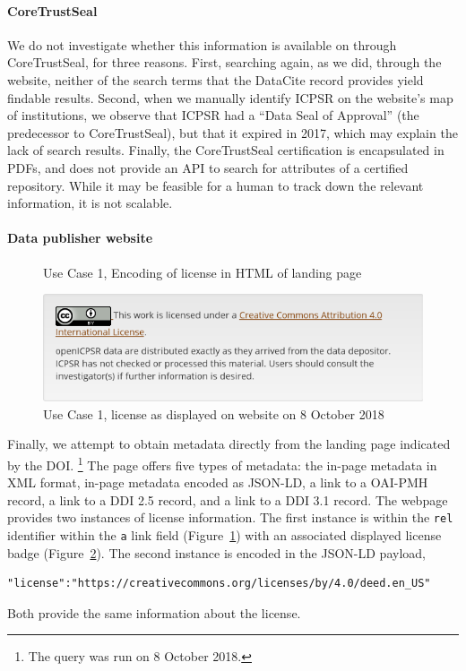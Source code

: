 \documentclass[10pt,letterpaper]{article}
\begin{document}
\paragraph{CoreTrustSeal}
We do not investigate whether this information is available on through CoreTrustSeal, for three reasons. First, searching again, as we did, through the website, neither of the search terms that the DataCite record provides yield findable results. Second, when we manually identify ICPSR on the website's map of institutions, we observe that ICPSR had a ``Data Seal of Approval'' (the predecessor to CoreTrustSeal), but that it expired in 2017, which may explain the lack of search results. Finally, the CoreTrustSeal certification is encapsulated in PDFs, and does not provide an API to search for attributes of a certified repository. While it may be feasible for a human to track down the relevant information, it is not scalable.

\paragraph{Data publisher website}
\newcommand{\icpsrdate}{8 October 2018}
\begin{figure}
	
	\caption{Use Case 1, Encoding of license in HTML of landing page}
	\label{fig:case1:rela}
\end{figure}
\begin{figure}
	\centering
	\includegraphics[width=0.5\linewidth]{../images/openicpsr-license-image.png}
	\caption{Use Case 1, license as displayed on website on \icpsrdate }
	\label{fig:case1:license}
\end{figure}
Finally, we attempt to obtain metadata   directly from the landing page indicated by the \ac{DOI}.%
\footnote{The query was run on \icpsrdate .}
The page offers five types of metadata: the in-page metadata in XML format, in-page metadata encoded as JSON-LD, a link to a OAI-PMH record, a link to a DDI 2.5 record, and a link to a DDI 3.1 record.
The webpage provides two instances of license information. The first instance is within the \texttt{rel} identifier within the \lstinline|a| link field (Figure~\ref{fig:case1:rela}) with an associated displayed  license badge (Figure~\ref{fig:case1:license}).
The second instance is encoded in the JSON-LD payload,
\begin{lstlisting}
"license":"https://creativecommons.org/licenses/by/4.0/deed.en_US"
\end{lstlisting}
Both provide the same information about the license.
\end{document}
